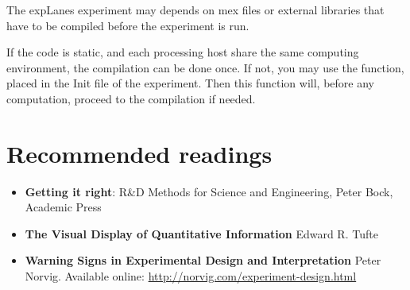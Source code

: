 \documentclass[a4paper,fleqn]{tufte-handout}
\newcommand{\explanes}{\textsf{expLanes} }
\begin{document}
The \explanes experiment may depends on mex files or external libraries that have to be compiled before the experiment is run.

If the code is static, and each processing host share the same computing environment, the compilation can be done once. If not, you may use the  function, placed in the Init file of the experiment. Then this function will, before any computation, proceed to the compilation if needed.

%
%
%
%
%
%
%
%
%
%
%
%
%

\section{Recommended readings}

\begin{itemize}

\item \textbf{Getting it right}: R\&D Methods for Science and Engineering, Peter Bock, Academic Press

\item \textbf{The Visual Display of Quantitative Information} Edward R. Tufte

\item \textbf{Warning Signs in Experimental Design and Interpretation} Peter Norvig.  Available online: \url{http://norvig.com/experiment-design.html}

\end{itemize}











\end{document}
